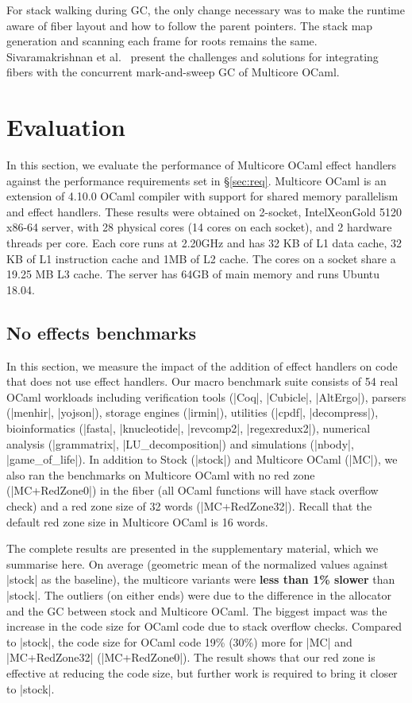\documentclass[sigplan,10pt,review,anonymous]{acmart}\settopmatter{printfolios=true,printccs=false,printacmref=false}
\begin{document}
For stack walking during GC, the only change necessary was to make the runtime
aware of fiber layout and how to follow the parent pointers. The stack map
generation and scanning each frame for roots remains the same. Sivaramakrishnan
et al.~\cite{Sivaramakrishnan20} present the challenges and solutions for
integrating fibers with the concurrent mark-and-sweep GC of Multicore OCaml.

\section{Evaluation}
\label{sec:eval}

In this section, we evaluate the performance of Multicore OCaml effect handlers
against the performance requirements set in \S\ref{sec:req}. Multicore OCaml is
an extension of 4.10.0 OCaml compiler with support for shared memory
parallelism and effect handlers. These results were obtained on 2-socket,
Intel\textregistered Xeon\textregistered Gold 5120 x86-64 server, with 28
physical cores (14 cores on each socket), and 2 hardware threads per core. Each
core runs at 2.20GHz and has 32 KB of L1 data cache, 32 KB of L1 instruction
cache and 1MB of L2 cache. The cores on a socket share a 19.25 MB L3 cache. The
server has 64GB of main memory and runs Ubuntu 18.04.

\vspace{-3mm}
\subsection{No effects benchmarks}

In this section, we measure the impact of the addition of effect handlers on
code that does not use effect handlers. Our macro benchmark suite consists of
54 real OCaml workloads including verification tools (|Coq|, |Cubicle|,
|AltErgo|), parsers (|menhir|, |yojson|), storage engines (|irmin|), utilities
(|cpdf|, |decompress|), bioinformatics (|fasta|, |knucleotide|, |revcomp2|,
|regexredux2|), numerical analysis (|grammatrix|, |LU_decomposition|) and
simulations (|nbody|, |game_of_life|). In addition to Stock (|stock|) and
Multicore OCaml (|MC|), we also ran the benchmarks on Multicore OCaml with no
red zone (|MC+RedZone0|) in the fiber (all OCaml functions will have stack
overflow check) and a red zone size of 32 words (|MC+RedZone32|). Recall that
the default red zone size in Multicore OCaml is 16 words.

The complete results are presented in the supplementary material, which we
summarise here. On average (geometric mean of the normalized values against
|stock| as the baseline), the multicore variants were \textbf{less than 1\%
slower} than |stock|. The outliers (on either ends) were due to the difference
in the allocator and the GC between stock and Multicore OCaml. The biggest
impact was the increase in the code size for OCaml code due to stack overflow
checks. Compared to |stock|, the code size for OCaml code 19\% (30\%) more for
|MC| and |MC+RedZone32| (|MC+RedZone0|). The result shows that our red zone is
effective at reducing the code size, but further work is required to bring it
closer to |stock|.
\end{document}
